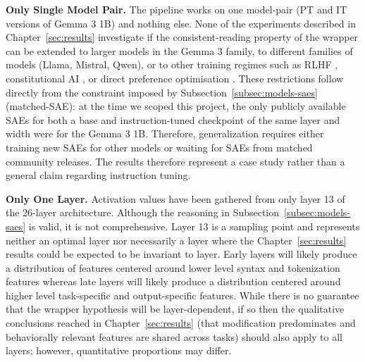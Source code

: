 \textbf{Only Single Model Pair.} The pipeline works on one model-pair (PT and IT versions of Gemma 3 1B) and nothing else. None of the experiments described in Chapter~\ref{sec:results} investigate if the consistent-reading property of the wrapper can be extended to larger models in the Gemma 3 family, to different families of models (Llama, Mistral, Qwen), or to other training regimes such as RLHF \parencite{christiano_deep_2023, ouyang_training_2022}, constitutional AI \parencite{bai_constitutional_2022}, or direct preference optimisation \parencite{rafailov_direct_2024}. These restrictions follow directly from the constraint imposed by Subsection~\ref{subsec:models-saes} (matched-SAE): at the time we scoped this project, the only publicly available SAEs for both a base and instruction-tuned checkpoint of the same layer and width were for the Gemma 3 1B. Therefore, generalization requires either training new SAEs for other models or waiting for SAEs from matched community releases. The results therefore represent a case study rather than a general claim regarding instruction tuning.

\textbf{Only One Layer.} Activation values have been gathered from only layer 13 of the 26-layer architecture. Although the reasoning in Subsection~\ref{subsec:models-saes} is valid, it is not comprehensive. Layer 13 is a sampling point and represents neither an optimal layer nor necessarily a layer where the Chapter~\ref{sec:results} results could be expected to be invariant to layer. Early layers will likely produce a distribution of features centered around lower level syntax and tokenization features whereas late layers will likely produce a distribution centered around higher level task-specific and output-specific features. While there is no guarantee that the wrapper hypothesis will be layer-dependent, if so then the qualitative conclusions reached in Chapter~\ref{sec:results} (that modification predominates and behaviorally relevant features are shared across tasks) should also apply to all layers; however, quantitative proportions may differ.

